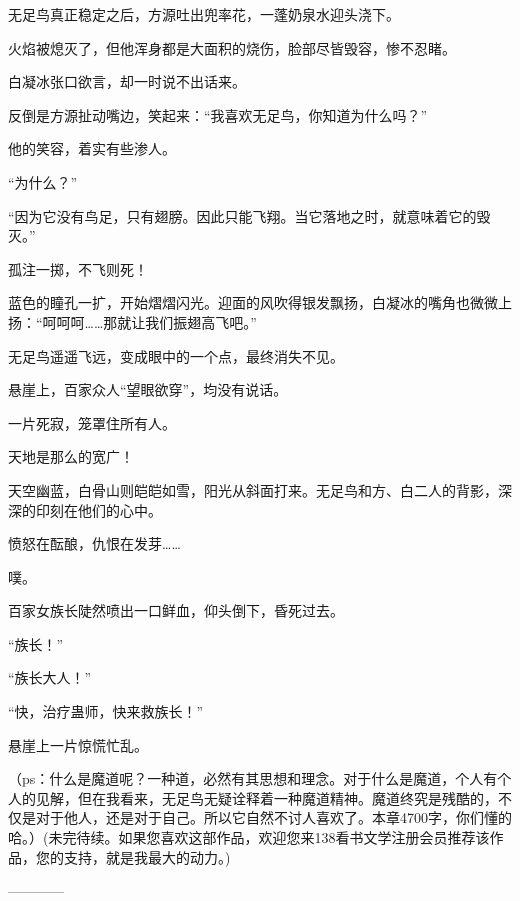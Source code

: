 \begin{this_body}
无足鸟真正稳定之后，方源吐出兜率花，一蓬奶泉水迎头浇下。

火焰被熄灭了，但他浑身都是大面积的烧伤，脸部尽皆毁容，惨不忍睹。

白凝冰张口欲言，却一时说不出话来。

反倒是方源扯动嘴边，笑起来：“我喜欢无足鸟，你知道为什么吗？”

他的笑容，着实有些渗人。

“为什么？”

“因为它没有鸟足，只有翅膀。因此只能飞翔。当它落地之时，就意味着它的毁灭。”

孤注一掷，不飞则死！

蓝色的瞳孔一扩，开始熠熠闪光。迎面的风吹得银发飘扬，白凝冰的嘴角也微微上扬：“呵呵呵……那就让我们振翅高飞吧。”

无足鸟遥遥飞远，变成眼中的一个点，最终消失不见。

悬崖上，百家众人“望眼欲穿”，均没有说话。

一片死寂，笼罩住所有人。

天地是那么的宽广！

天空幽蓝，白骨山则皑皑如雪，阳光从斜面打来。无足鸟和方、白二人的背影，深深的印刻在他们的心中。

愤怒在酝酿，仇恨在发芽……

噗。

百家女族长陡然喷出一口鲜血，仰头倒下，昏死过去。

“族长！”

“族长大人！”

“快，治疗蛊师，快来救族长！”

悬崖上一片惊慌忙乱。

（ps：什么是魔道呢？一种道，必然有其思想和理念。对于什么是魔道，个人有个人的见解，但在我看来，无足鸟无疑诠释着一种魔道精神。魔道终究是残酷的，不仅是对于他人，还是对于自己。所以它自然不讨人喜欢了。本章4700字，你们懂的哈。）(未完待续。如果您喜欢这部作品，欢迎您来138看书文学注册会员推荐该作品，您的支持，就是我最大的动力。)

------------

\end{this_body}


